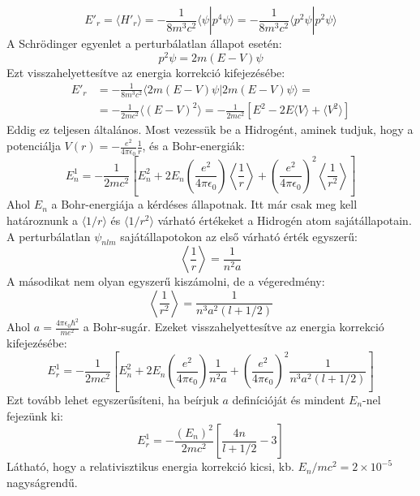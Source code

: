 \documentclass[../main.tex]{subfiles}
\begin{document}
\begin{equation}
    E'_{r} = \langle H'_{r}\rangle = - \frac{1}{8 m^3 c^2} \langle \psi | p^4 \psi \rangle = - \frac{1}{8 m^3 c^2} \langle p^2 \psi | p^2 \psi \rangle
\end{equation}
A Schrödinger egyenlet a perturbálatlan állapot esetén:
\begin{equation}
    p^2 \psi = 2m (E - V) \psi
\end{equation}
Ezt visszahelyettesítve az energia korrekció kifejezésébe:
\begin{equation}
    \begin{aligned}
        E'_{r} &= - \frac{1}{8 m^3 c^2} \langle 2m (E - V) \psi | 2m (E - V) \psi \rangle = \\
        &= - \frac{1}{2 m c^2} \langle (E - V)^2 \rangle = - \frac{1}{2 m c^2} \left[ E^2 - 2 E \langle V \rangle + \langle V^2 \rangle \right]
    \end{aligned}
\end{equation}
Eddig ez teljesen általános. Most vezessük be a Hidrogént, aminek tudjuk, hogy a potenciálja $V(r) = - \frac{e^2}{4 \pi \epsilon_0} \frac{1}{r}$, és a Bohr-energiák:
\begin{equation}
    E^1_n = - \frac{1}{2mc^2} \left[E^2_n + 2E_n \left(\frac{e^2}{4 \pi \epsilon_0} \right) \left\langle \frac{1}{r} \right\rangle + \left(\frac{e^2}{4 \pi \epsilon_0}\right)^2 \left\langle \frac{1}{r^2} \right\rangle \right]
\end{equation}
Ahol $E_n$ a Bohr-energiája a kérdéses állapotnak. Itt már csak meg kell határoznunk a $\langle 1/r \rangle$ és $\langle 1/r^2 \rangle$ várható értékeket a Hidrogén atom sajátállapotain.
A perturbálatlan $\psi_{n l m}$ sajátállapotokon az első várható érték egyszerű:
\begin{equation}
    \left\langle \frac{1}{r} \right\rangle = \frac{1}{n^2 a}
\end{equation}
A másodikat nem olyan egyszerű kiszámolni, de a végeredmény:
\begin{equation}
    \left\langle \frac{1}{r^2} \right\rangle = \frac{1}{n^3 a^2 (l + 1/2)}
\end{equation}
Ahol $a = \frac{4 \pi \epsilon_0 \hbar^2}{m e^2}$ a Bohr-sugár. Ezeket visszahelyettesítve az energia korrekció kifejezésébe:
\begin{equation}
    E^1_{r} = - \frac{1}{2 m c^2} \left[ E^2_n + 2 E_n \left(\frac{e^2}{4 \pi \epsilon_0} \right) \frac{1}{n^2 a} + \left(\frac{e^2}{4 \pi \epsilon_0}\right)^2 \frac{1}{n^3 a^2 (l + 1/2)} \right]
\end{equation}
Ezt tovább lehet egyszerűsíteni, ha beírjuk $a$ definícióját és mindent $E_n$-nel fejezünk ki:
\begin{equation}
    E^1_{r} = - \frac{(E_n)^2}{2m c^2} \left[ \frac{4n}{l + 1/2} - 3 \right]
\end{equation}
Látható, hogy a relativisztikus energia korrekció kicsi, kb. $E_n/mc^2 = 2 \times 10^{-5}$ nagyságrendű.
\end{document}
